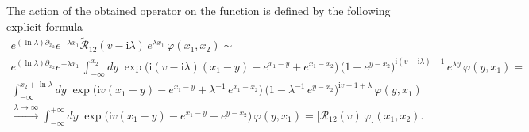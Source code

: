 \documentclass[11pt]{article}
\numberwithin{equation}{section}
\theoremstyle{plain}
\theoremstyle{definition}
\renewcommand{\phi}{\varphi}
\renewcommand{\imath}{\mathrm{i}}
\begin{document}
The action of the obtained operator on the function is defined 
by the following explicit formula 
\begin{multline*}
	e^{(\ln\lambda)\partial_{x_2}}e^{-\lambda x_1}\widetilde{\mathcal{R}}_{12}(v-\imath\lambda)\,e^{\lambda x_1} \, 
	\phi(x_1, x_2) \sim  \\[4pt]
	e^{(\ln\lambda)\partial_{x_2}}e^{-\lambda x_1}\,
	\int_{-\infty}^{x_2} dy \;\exp \bigl( \imath (v-\imath\lambda)(x_1 - y) - e^{x_1 - y} + e^{x_1 - x_2} \bigr) \, \bigl(1 - e^{y- x_2} \bigr)^{\imath (v-\imath\lambda) - 1} \, 
	e^{\lambda y}\, \phi(y, x_1) = \\[4pt] 
	\int_{-\infty}^{x_2+\ln\lambda} dy \;\exp \bigl( \imath v(x_1 - y) - e^{x_1 - y} + \lambda^{-1}\,e^{x_1 - x_2} \bigr) \, 
	\bigl(1 - \lambda^{-1}\,e^{y- x_2} \bigr)^{\imath v - 1+\lambda} \, 
	\phi(y, x_1) \\[4pt]  
	\xrightarrow{\lambda\to\infty}
	\int_{-\infty}^{+\infty} dy \;\exp \bigl( \imath v(x_1 - y) - e^{x_1 - y} - 
	e^{y - x_2} \bigr) \,\phi(y, x_1) = 
	\bigl[\mathcal{R}_{12}(v) \, \phi \bigr] (x_1, x_2).
\end{multline*}
\end{document}
